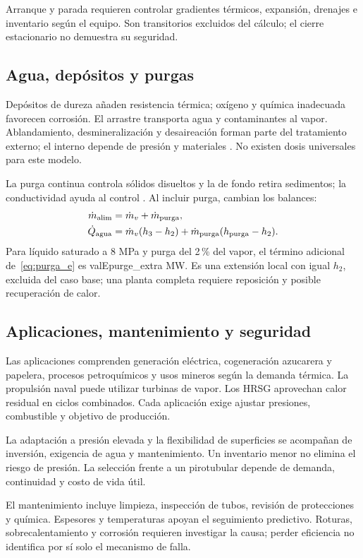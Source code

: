 \documentclass[conference,a4paper,11pt]{IEEEtran}
\newcommand{\V}[1]{\csname val#1\endcsname}
\begin{document}
Arranque y parada requieren controlar gradientes térmicos, expansión, drenajes e inventario según el equipo. Son transitorios excluidos del cálculo; el cierre estacionario no demuestra su seguridad.

\subsection{Agua, depósitos y purgas}
Depósitos de dureza añaden resistencia térmica; oxígeno y química inadecuada favorecen corrosión. El arrastre transporta agua y contaminantes al vapor. Ablandamiento, desmineralización y desaireación forman parte del tratamiento externo; el interno depende de presión y materiales \cite{spirax_agua}. No existen dosis universales para este modelo.

La purga continua controla sólidos disueltos y la de fondo retira sedimentos; la conductividad ayuda al control \cite{spirax_purga}. Al incluir purga, cambian los balances:
\begin{align}
\dot m_{\rm alim}&=\dot m_v+\dot m_{\rm purga},\label{eq:purga_m}\\
\dot Q_{\rm agua}&=\dot m_v(h_3-h_2)
 +\dot m_{\rm purga}(h_{\rm purga}-h_2).\label{eq:purga_e}
\end{align}
Para líquido saturado a 8 MPa y purga del 2\,\% del vapor, el término adicional de~\eqref{eq:purga_e} es \V{Epurge_extra} MW. Es una extensión local con igual $h_2$, excluida del caso base; una planta completa requiere reposición y posible recuperación de calor.

\subsection{Aplicaciones, mantenimiento y seguridad}
Las aplicaciones comprenden generación eléctrica, cogeneración azucarera y papelera, procesos petroquímicos y usos mineros según la demanda térmica. La propulsión naval puede utilizar turbinas de vapor. Los HRSG aprovechan calor residual en ciclos combinados. Cada aplicación exige ajustar presiones, combustible y objetivo de producción.

La adaptación a presión elevada y la flexibilidad de superficies se acompañan de inversión, exigencia de agua y mantenimiento. Un inventario menor no elimina el riesgo de presión. La selección frente a un pirotubular depende de demanda, continuidad y costo de vida útil.

El mantenimiento incluye limpieza, inspección de tubos, revisión de protecciones y química. Espesores y temperaturas apoyan el seguimiento predictivo. Roturas, sobrecalentamiento y corrosión requieren investigar la causa; perder eficiencia no identifica por sí solo el mecanismo de falla.
\end{document}
